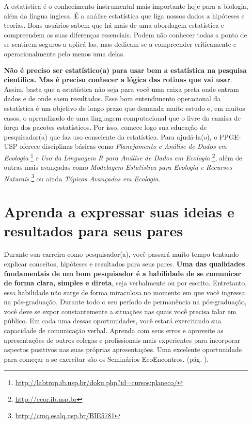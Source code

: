 A estatística é o conhecimento instrumental mais importante hoje para
a biologia, além da língua inglesa. É a análise estatística que liga
nossos dados a hipóteses e teorias. Bons usuários sabem que há mais de
uma abordagem estatística e compreendem as suas diferenças
essenciais. Podem não conhecer todas a ponto de se sentirem seguros a
aplicá-las, mas dedicam-se a compreender criticamente e
operacionalmente pelo menos uma delas.

\textbf{Não é preciso ser estatístico(a) para usar bem a estatística
  na pesquisa científica. Mas é preciso conhecer a lógica das rotinas
  que vai usar}. Assim, basta que a estatística não seja para você uma
caixa preta onde entram dados e de onde saem resultados. Esse bom
entendimento operacional da estatística é um objetivo de longo prazo
que demanda muito estudo e, em muitos casos, o aprendizado de uma
linguagem computacional que o livre da camisa de força dos pacotes
estatísticos. Por isso, comece logo sua educação de pesquisador(a) que
faz uso consciente da estatística. Para ajudá-la(o), o PPGE- USP
oferece disciplinas básicas como \emph{Planejamento e Análise de Dados
  em Ecologia} \footnote{\url{http://labtrop.ib.usp.br/doku.php?id=cursos:planeco/}} e
\emph{Uso da Linguagem R para Análise de Dados em Ecologia}
\footnote{\url{http://ecor.ib.usp.br}}, além de outras
mais avançadas como \emph{Modelagem Estatística para Ecologia e
  Recursos Naturais} \footnote{\url{http://cmq.esalq.usp.br/BIE5781}}
ou ainda \emph{Tópicos Avançados em Ecologia}.

\section{Aprenda a expressar suas ideias e resultados para seus pares}

Durante sua carreira como pesquisador(a), você passará muito tempo
tentando explicar conceitos, hipóteses e resultados para seus
pares. \textbf{Uma das qualidades fundamentais de um bom pesquisador é
  a habilidade de se comunicar de forma clara, simples e direta}, seja
verbalmente ou por escrito. Entretanto, essa habilidade não surge de
forma miraculosa no momento em que você ingressa na
pós-graduação. Durante todo o seu período de permanência na
pós-graduação, você deve se expor constantemente a situações nas quais
você precisa falar em público. Em cada uma dessas oportunidades, você
estará exercitando sua capacidade de comunicação verbal. Aprenda com
seus erros e aproveite as apresentações de outros colegas e
profissionais mais experientes para incorporar aspectos positivos nas
suas próprias apresentações. Uma excelente oportunidade para começar a
se exercitar são os Seminários
EcoEncontros. (pág. \pageref{subsec:seminarios}).

